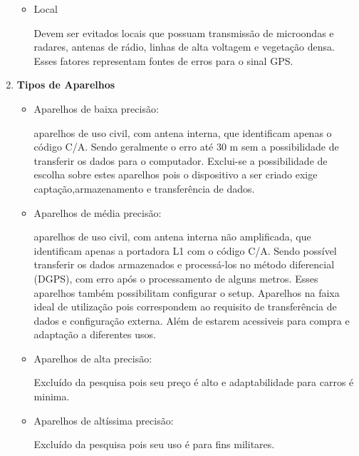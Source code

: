 \begin{enumerate}
\begin{itemize}
      \item Local

        Devem ser evitados locais que possuam transmissão de microondas e radares, 	antenas de rádio, linhas de alta voltagem e vegetação densa. Esses fatores representam fontes de erros para o sinal GPS.

    \end{itemize}

  \item \textbf{Tipos de Aparelhos}
    \begin{itemize}
      \item Aparelhos de baixa precisão:
      
        aparelhos de uso civil, com antena interna, que identificam apenas o código C/A. Sendo geralmente o erro até 30 m sem a possibilidade de transferir os dados para o computador.
        Exclui-se a possibilidade de escolha sobre estes aparelhos pois o dispositivo a ser criado exige captação,armazenamento e transferência de dados.

      \item Aparelhos de média precisão:
      
        aparelhos de uso civil, com antena interna não amplificada, que identificam apenas a portadora L1 com o código C/A. Sendo possível transferir os dados armazenados e processá-los no método diferencial (DGPS), com erro após o processamento de alguns metros. Esses aparelhos também possibilitam configurar o setup.
        Aparelhos na faixa ideal de utilização pois correspondem ao requisito de transferência de dados e configuração externa. Além de estarem acessiveis para compra e adaptação a diferentes usos.

      \item Aparelhos de alta precisão:
      
        Excluído da pesquisa pois seu preço é alto e adaptabilidade para carros é minima.

      \item Aparelhos de altíssima precisão:
      
        Excluído da pesquisa pois seu uso é para fins militares.

    \end{itemize}
\end{enumerate}
